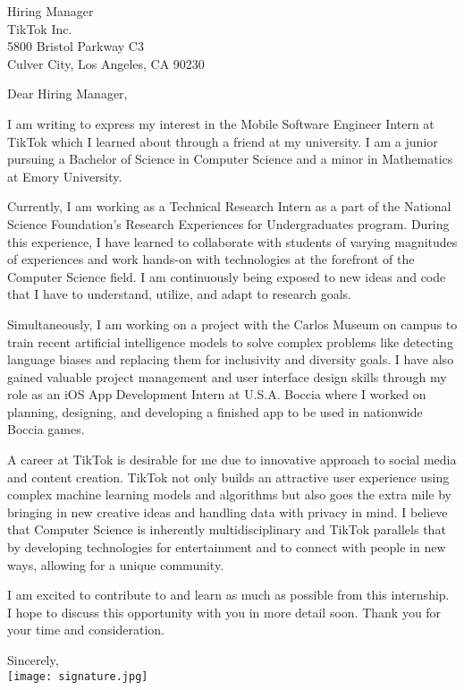 \documentclass[letterpaper,12pt]{letter}
\date{}
\begin{document}
\begin{letter}{%
    Hiring Manager \\ 
	TikTok Inc. \\
	5800 Bristol Parkway C3 \\
    Culver City, Los Angeles, CA 90230
}

\opening{Dear Hiring Manager,}

I am writing to express my interest in the Mobile Software Engineer Intern at TikTok
which I learned about through a friend at my university. I am a junior pursuing 
a Bachelor of Science in Computer Science and a minor in Mathematics at Emory University.

Currently, I am working as a Technical Research Intern as a part of the National Science Foundation's 
Research Experiences for Undergraduates program. During this experience, I have learned to 
collaborate with students of varying magnitudes of experiences and work hands-on with technologies at 
the forefront of the Computer Science field. I am continuously being exposed to new ideas 
and code that I have to understand, utilize, and adapt to research goals. 

Simultaneously, I am working on a project with the Carlos Museum on campus to train recent 
artificial intelligence models to solve complex problems like detecting language biases and 
replacing them for inclusivity and diversity goals. I have also gained valuable project management 
and user interface design skills through my role as an iOS App Development Intern at U.S.A. Boccia 
where I worked on planning, designing, and developing a finished app to be used in nationwide Boccia games. 

A career at TikTok is desirable for me due to innovative approach to social media and content creation. 
TikTok not only builds an attractive user experience using complex machine learning models and algorithms 
but also goes the extra mile by bringing in new creative ideas and handling data with privacy in mind. 
I believe that Computer Science is inherently multidisciplinary and TikTok parallels that 
by developing technologies for entertainment and to connect with people in new ways, allowing for a unique community.

I am excited to contribute to and learn as much as possible from this internship. I hope to discuss
this opportunity with you in more detail soon. Thank you for your time and consideration.\\

\closing{Sincerely, \\
\vspace{10pt}
\texttt{[image: signature.jpg]}}


\end{letter}

\end{document}
